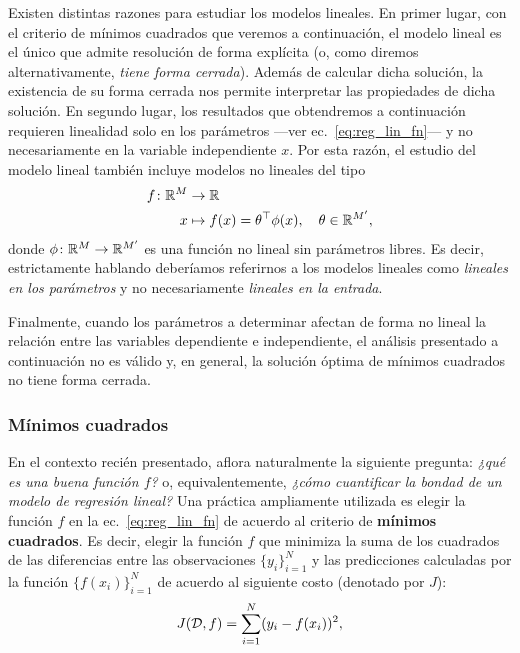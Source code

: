 \begin{mdframed}[style=discusion, frametitle={\center ¿Por qué consideramos el caso lineal en particular?}]
	Existen distintas razones para estudiar los modelos lineales. En primer lugar, con el criterio de mínimos cuadrados que veremos a continuación, el modelo lineal es el único que admite resolución de forma explícita (o, como diremos alternativamente, \emph{tiene forma cerrada}). Además de calcular dicha solución, la existencia de su forma cerrada nos permite interpretar las propiedades de dicha solución. En segundo lugar, los resultados que obtendremos a continuación requieren linealidad solo en los parámetros ---ver ec.~\eqref{eq:reg_lin_fn}--- y no necesariamente en la variable independiente $x$. Por esta razón, el estudio del modelo lineal también incluye modelos no lineales del tipo
\begin{align}
  f \colon \mathbb{R}^M & \to \mathbb{R}\nonumber\\
  x &\mapsto f(x)=\theta^\top \phi(x), \quad \theta\in\mathbb{R}^{M'},
 \label{eq:reg_no_lin_fn} 
\end{align}
donde $\phi \colon \mathbb{R}^M \to \mathbb{R}^{M'}$ es una función no lineal sin parámetros libres. Es decir, estrictamente hablando deberíamos referirnos a los modelos lineales como \emph{lineales en los parámetros} y no necesariamente \emph{lineales en la entrada}. 

Finalmente, cuando los parámetros a determinar afectan de forma no lineal la relación entre las variables dependiente e independiente, el análisis presentado a continuación no es válido y, en general, la solución óptima de mínimos cuadrados no tiene forma cerrada. 
\end{mdframed}

\subsubsection{Mínimos cuadrados}
\label{ssub:min_cuad}
En el contexto recién presentado, aflora naturalmente la siguiente pregunta: \emph{¿qué es una buena función $f$?} o, equivalentemente, \emph{¿cómo cuantificar la bondad de un modelo de regresión lineal?} Una práctica ampliamente utilizada es elegir la función $f$ en la ec.~\eqref{eq:reg_lin_fn} de acuerdo al criterio de \textbf{mínimos cuadrados}. Es decir, elegir la función $f$ que minimiza la suma de los cuadrados de las diferencias entre las observaciones $\{y_i\}_{i=1}^N$ y las predicciones calculadas por la función $\{f(x_i)\}_{i=1}^N$ de acuerdo al siguiente costo (denotado por $J$):
\begin{equation}
	J({\mathcal D},f) = \sum_{i=1}^N(y_i-f(x_i))^2,
	\label{eq:least_squares_cost}
\end{equation}

